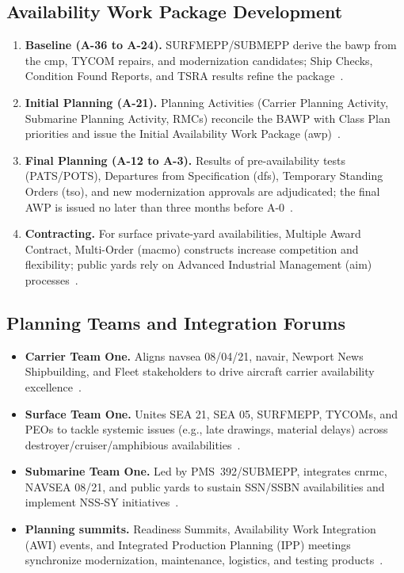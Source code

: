 \documentclass[../main.tex]{subfiles}
\begin{document}
\subsection{Availability Work Package Development}
\begin{enumerate}
\item \textbf{Baseline (A-36 to A-24).} SURFMEPP/SUBMEPP derive the \ac{bawp} from the \ac{cmp}, TYCOM repairs, and modernization candidates; Ship Checks, Condition Found Reports, and TSRA results refine the package~\autocite{edo-4-2-1-cno-availability-planning-2025,COMFLTFORCOMINST4790-3}.
\item \textbf{Initial Planning (A-21).} Planning Activities (Carrier Planning Activity, Submarine Planning Activity, RMCs) reconcile the BAWP with Class Plan priorities and issue the Initial Availability Work Package (\ac{awp})~\autocite{edo-4-2-1-cno-availability-planning-2025}.
\item \textbf{Final Planning (A-12 to A-3).} Results of pre-availability tests (PATS/POTS), Departures from Specification (\ac{dfs}), Temporary Standing Orders (\ac{tso}), and new modernization approvals are adjudicated; the final AWP is issued no later than three months before A-0~\autocite{edo-4-2-1-cno-availability-planning-2025,OPNAVNOTE4700-24}.
\item \textbf{Contracting.} For surface private-yard availabilities, Multiple Award Contract, Multi-Order (\ac{macmo}) constructs increase competition and flexibility; public yards rely on Advanced Industrial Management (\ac{aim}) processes~\autocite{edo-4-2-1-cno-availability-planning-2025}.
\end{enumerate}

\subsection{Planning Teams and Integration Forums}
\begin{itemize}
\item \textbf{Carrier Team One.} Aligns \ac{navsea} 08/04/21, \ac{navair}, Newport News Shipbuilding, and Fleet stakeholders to drive aircraft carrier availability excellence~\autocite{edo-4-2-1-cno-availability-planning-2025}.
\item \textbf{Surface Team One.} Unites SEA 21, SEA 05, SURFMEPP, TYCOMs, and PEOs to tackle systemic issues (e.g., late drawings, material delays) across destroyer/cruiser/amphibious availabilities~\autocite{edo-4-2-1-cno-availability-planning-2025}.
\item \textbf{Submarine Team One.} Led by PMS~392/SUBMEPP, integrates \ac{cnrmc}, NAVSEA 08/21, and public yards to sustain SSN/SSBN availabilities and implement NSS-SY initiatives~\autocite{edo-4-2-1-cno-availability-planning-2025}.
\item \textbf{Planning summits.} Readiness Summits, Availability Work Integration (AWI) events, and Integrated Production Planning (IPP) meetings synchronize modernization, maintenance, logistics, and testing products~\autocite{edo-4-2-1-cno-availability-planning-2025}.
\end{itemize}
\end{document}
